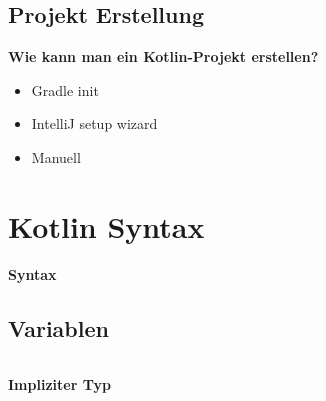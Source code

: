     \subsection{Projekt Erstellung}\label{subsec:projekt-erstellung}
    \begin{frame}
        \slidehead
        \large
        \textbf{Wie kann man ein Kotlin-Projekt erstellen?}
        \begin{itemize}[<+->]
            \item Gradle init
            \item IntelliJ setup wizard
            \item Manuell
        \end{itemize}
    \end{frame}


    \section{Kotlin Syntax}\label{sec:kotlin-syntax}
    \begin{frame}[c]
        \centering
        \Large
        \textbf{Syntax}
    \end{frame}

    \subsection{Variablen}\label{subsec:variablen}
    \begin{frame}[c]
        \slidehead
        \begin{columns}[c]
            \begin{column}{.5\textwidth}
                \centering
                \Large
                \textbf{Impliziter Typ}
                \normalsize
            \end{column}
            \begin{column}{.5\textwidth}
            \end{column}
        \end{columns}
    \end{frame}

